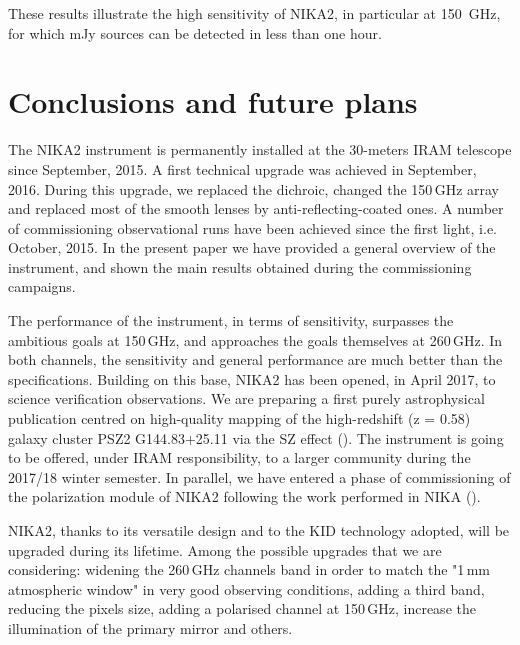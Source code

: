 \documentclass[]{aa} %
\begin{document}
These results illustrate the high sensitivity of NIKA2, in particular at 150~GHz, for which mJy sources can be detected in less than one hour.


%
%

\section{Conclusions and future plans}

The NIKA2 instrument is permanently installed at the 30-meters IRAM telescope since September, 2015. A first technical upgrade was achieved in September, 2016. During this upgrade, we replaced the dichroic, changed the 150\,GHz array and replaced most of the smooth lenses by anti-reflecting-coated ones. A number of commissioning observational runs have been achieved since the first light, i.e. October, 2015. In the present paper we have provided a general overview of the instrument, and shown the main results obtained during the commissioning campaigns. 

The performance of the instrument, in terms of sensitivity, surpasses the ambitious goals at 150\,GHz, and approaches the goals themselves at 260\,GHz. In both channels, the sensitivity and general performance are much better than the specifications. 
Building on this base, NIKA2 has been opened, in April 2017, to science verification observations. We are preparing a first purely astrophysical publication centred on high-quality mapping of the high-redshift (z = 0.58) galaxy cluster PSZ2 G144.83+25.11 via the SZ effect (\cite{Ruppin2017}). The instrument is going to be offered, under IRAM responsibility, to a larger community during the 2017/18 winter semester. In parallel, we have entered a phase of commissioning of the polarization module of NIKA2 following the work performed in NIKA (\cite{Ritacco2017}). 

NIKA2, thanks to its versatile design and to the KID technology adopted, will be upgraded during its lifetime. Among the possible upgrades that we are considering: widening the 260\,GHz channels band in order to match the "1\,mm atmospheric window" in very good observing conditions, adding a third band, reducing the pixels size, adding a polarised channel at 150\,GHz, increase the illumination of the primary mirror and others. 
\end{document}
